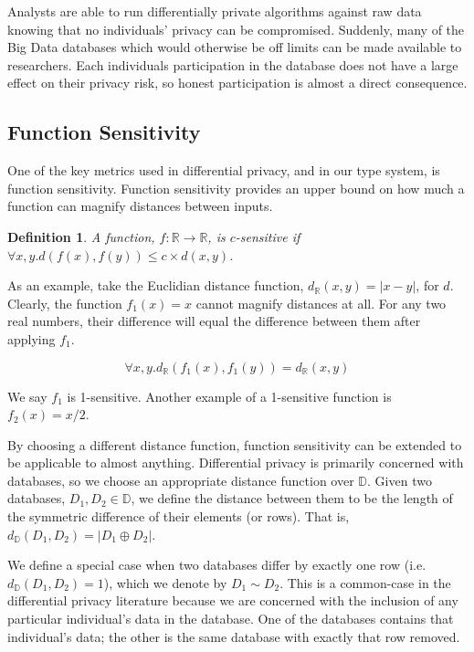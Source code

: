 \documentclass[12pt]{article}
\newtheorem{defn}{Definition}[section]
\begin{document}
Analysts are able to run differentially private algorithms against raw data knowing that no individuals' privacy can be compromised.
Suddenly, many of the Big Data databases which would otherwise be off limits can be made available to researchers.
Each individuals participation in the database does not have a large effect on their privacy risk, so honest participation is almost a direct consequence.

\subsection{Function Sensitivity}

One of the key metrics used in differential privacy, and in our type system, is function sensitivity.
Function sensitivity provides an upper bound on how much a function can magnify distances between inputs.

\begin{defn}\label{def:csens}
  A function, $f : \mathbb{R} \rightarrow \mathbb{R}$, is $c$-sensitive if
  $\forall x,y.d(f(x),f(y)) \le c \times d(x,y)$.
\end{defn}

As an example, take the Euclidian distance function, $d_\mathbb{R}(x,y) = |x - y|$, for $d$.
Clearly, the function $f_1(x)=x$ cannot magnify distances at all.
For any two real numbers, their difference will equal the difference between them after applying $f_1$.

\[
  \forall x,y.d_\mathbb{R}(f_1(x),f_1(y)) = d_\mathbb{R}(x,y)
\]

We say $f_1$ is 1-sensitive.
Another example of a 1-sensitive function is $f_2(x) = x/2$.

By choosing a different distance function, function sensitivity can be extended to be applicable to almost anything.
Differential privacy is primarily concerned with databases, so we choose an appropriate distance function over $\mathbb{D}$.
Given two databases, $D_1, D_2 \in \mathbb{D}$, we define the distance between them to be the length of the symmetric difference of their elements (or rows).
That is, $d_\mathbb{D}(D_1,D_2) = |D_1 \oplus D_2|$.

We define a special case when two databases differ by exactly one row (i.e. $d_\mathbb{D}(D_1,D_2)=1$), which we denote by $D_1 \sim D_2$.
This is a common-case in the differential privacy literature because we are concerned with the inclusion of any particular individual's data in the database.
One of the databases contains that individual's data; the other is the same database with exactly that row removed.
\end{document}

